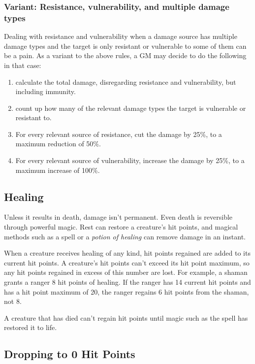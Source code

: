 \subsubsection{Variant: Resistance, vulnerability, and multiple damage types}
Dealing with resistance and vulnerability when a damage source has multiple damage types and the target is only resistant or vulnerable to some of them can be a pain. As a variant to the above rules, a GM may decide to do the following in that case:
\begin{enumerate}
    \item calculate the total damage, disregarding resistance and vulnerability, but including immunity.
    \item count up how many of the relevant damage types the target is vulnerable or resistant to.
    \item For every relevant source of resistance, cut the damage by 25\%, to a maximum reduction of 50\%.
    \item For every relevant source of vulnerability, increase the damage by 25\%, to a maximum increase of 100\%.
\end{enumerate}

\subsection{Healing}

Unless it results in death, damage isn't permanent. Even death is reversible through powerful magic. Rest can restore a creature's hit points, and magical methods such as a  spell or a \textit{potion of healing} can remove damage in an instant.

When a creature receives healing of any kind, hit points regained are added to its current hit points. A creature's hit points can't exceed its hit point maximum, so any hit points regained in excess of this number are lost. For example, a shaman grants a ranger 8 hit points of healing. If the ranger has 14 current hit points and has a hit point maximum of 20, the ranger regains 6 hit points from the shaman, not 8.

A creature that has died can't regain hit points until magic such as the  spell has restored it to life.

\subsection{Dropping to 0 Hit Points}

